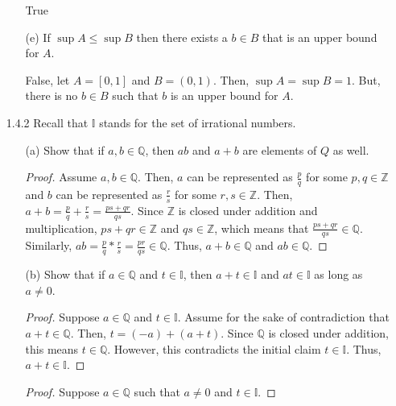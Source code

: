 \documentclass[12pt,letterpaper]{article}
\begin{document}
\begin{itemize}[leftmargin=!,labelindent=5pt]
\begin{itemize}
                True
            \item [(e)] If $\sup A \leq \sup B$ then there exists a $b\in B$ that is an upper bound for $A$.
            
            False, let $A = [0, 1]$ and $B = (0, 1)$. Then, $\sup A = \sup B = 1$.
            But, there is no $b \in B$ such that $b$ is an upper bound for $A$.
        \end{itemize}
        \newpage
        \item[1.4.2] Recall that $\mathbb{I}$ stands for the set of irrational numbers.
            \begin{itemize}
                \item [(a)] Show that if $a,b\in \mathbb{Q}$, then $ab$ and $a+b$ are elements of $Q$ as well.
                    \begin{proof}
                        Assume $a,b\in \mathbb{Q}$.
                        Then, $a$ can be represented as $\frac{p}{q}$ for some $p,q \in \mathbb{Z}$ and $b$ can be represented as $\frac{r}{s}$ for some $r,s \in \mathbb{Z}$.
                        Then, $a+b = \frac{p}{q} + \frac{r}{s} = \frac{ps + qr}{qs}$.
                        Since $\mathbb{Z}$ is closed under addition and multiplication, $ps + qr \in \mathbb{Z}$ and $qs \in \mathbb{Z}$, which means that $\frac{ps + qr}{qs} \in \mathbb{Q}$.
                        Similarly, $ab = \frac{p}{q} * \frac{r}{s} = \frac{pr}{qs} \in \mathbb{Q}$.
                        Thus, $a+b\in \mathbb{Q}$ and $ab\in \mathbb{Q}$.
                    \end{proof}
                \item [(b)] Show that if $a\in \mathbb{Q}$ and $t \in \mathbb{I}$, then $a+t\in \mathbb{I}$ and $at \in \mathbb{I}$ as long as $a \neq 0$.
                    \begin{proof}
                        Suppose $a\in \mathbb{Q}$ and $t \in \mathbb{I}$.
                        Assume for the sake of contradiction that $a + t \in \mathbb{Q}$.
                        Then, $t = (-a) + (a + t)$.
                        Since $\mathbb{Q}$ is closed under addition, this means $t \in \mathbb{Q}$.
                        However, this contradicts the initial claim $t \in \mathbb{I}$.
                        Thus, $a+t\in \mathbb{I}$.
                    \end{proof}
                    \begin{proof}
                        Suppose $a\in \mathbb{Q}$ such that $a \neq 0$ and $t \in \mathbb{I}$.

\end{proof}
\end{itemize}
\end{itemize}
\end{document}
